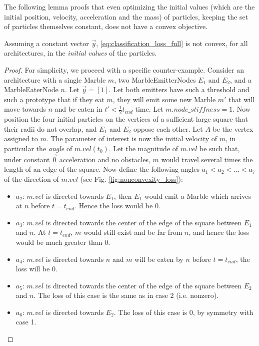 The following lemma proofs that even optimizing the initial values (which are the initial position, velocity, acceleration and the mass) of particles, keeping the set of particles themselves constant, does not have a convex objective.
\begin{lemma}
Assuming a constant vector $\vec{y}$, \eqref{eq:classification_loss_full} is not convex, for all \nenwin architectures, in the \emph{initial values} of the particles.
\label{lemma:nonconvexity_loss}
\end{lemma}
\begin{proof}
For simplicity, we proceed with a specific counter-example. 
Consider an architecture with a single Marble $m$, two MarbleEmitterNodes $E_1$ and $E_2$, and a MarbleEaterNode $n$.
Let $\vec{y} = [1]$. 
Let both emitters have such a threshold and such a prototype that if they eat $m$, 
they will emit some new Marble $m'$ that will move towards $n$ and be eaten in $t' < \frac{1}{2}t_{end}$ time. 
Let $m.node\_stiffness = 1$. 
Now position the four initial particles on the vertices of a sufficient large square that their radii do not overlap, 
and $E_1$ and $E_2$ oppose each other. 
Let $A$ be the vertex assigned to $m$. 
The parameter of interest is now the initial velocity of $m$, in particular the \emph{angle} of $m.vel(t_0)$. 
Let the magnitude of $m.vel$ be such that, under constant $\vec{0}$ acceleration and no obstacles, 
$m$ would travel several times the length of an edge of the square. 
Now define the following angles $a_1 < a_2 < \dots < a_7$ of the direction of $m.vel$ (see Fig. \ref{fig:nonconvexity_loss}):
\begin{itemize}
    \item $a_2$: $m.vel$ is directed towards $E_1$, then $E_1$ would emit a Marble which arrives at $n$ before $t = t_{end}$. Hence the loss would be 0.
    \item $a_3$: $m.vel$ is directed towards the center of the edge of the square between $E_1$ and $n$. At $t = t_{end}$, $m$ would still exist and be far from $n$, and hence the loss would be much greater than 0.
    \item $a_4$: $m.vel$ is directed towards $n$ and $m$ will be eaten by $n$ before $t = t_{end}$, the loss will be 0.
    \item $a_5$: $m.vel$ is directed towards the center of the edge of the square between $E_2$ and $n$. The loss of this case is the same as in case 2 (i.e. nonzero).
    \item $a_6$: $m.vel$ is directed towards $E_2$. The loss of this case is 0, by symmetry with case 1.

\end{itemize}
\end{proof}
